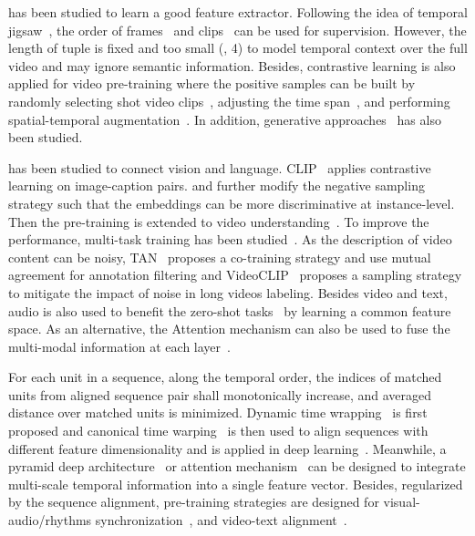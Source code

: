  has been studied to learn a good feature extractor. 
Following the idea of temporal jigsaw~\cite{huo2020self}, the order of frames~\citep{misra2016shuffle,lee2017unsupervised} and clips~\citep{xu2019self} can be used for supervision. However, the length of tuple is fixed and too small (\eg, 4) to model temporal context over the full video and may ignore semantic information.
Besides, contrastive learning is also applied for video pre-training where the positive samples can be built by randomly selecting shot video clips~\citep{feichtenhofer2021large}, adjusting the time span~\citep{recasens2021broaden}, and performing spatial-temporal augmentation~\citep{jenni2020video}. In addition, generative approaches~\cite{han2020memory,vondrick2016generating} has also been studied.

 has been studied to connect vision and language. CLIP~\citep{radford2021learning} applies contrastive learning on image-caption pairs.
\citet{yang2022unified} and \citet{li2022grounded} further modify the negative sampling strategy such that the embeddings can be more discriminative at instance-level. 
Then the pre-training is extended to video understanding~\citet{miech2020end,ging2020coot,gabeur2020multi,alayrac2020self,wang2022object}. To improve the performance,  multi-task training has been studied~\citep{li2020hero,luo2020univl}. 
As the description of video content can be noisy, TAN~\citep{han2022temporal} proposes a co-training strategy and use mutual agreement for annotation filtering and VideoCLIP~\citep{xu2021videoclip} proposes a sampling strategy to mitigate the impact of noise in long videos labeling.
Besides video and text, audio is also used to benefit the zero-shot tasks~\citep{chen2021multimodal,shvetsova2022everything} by learning a common feature space.
As an alternative, the Attention mechanism can also be used to fuse the multi-modal information at each layer~\citep{sun2019videobert,su2019vl,chen2020uniter}.

 For each unit in a sequence, along the temporal order, the indices of matched units from aligned sequence pair shall monotonically increase, and averaged distance over matched units is minimized.
Dynamic time wrapping~\citep{muller2007dynamic} is first proposed and canonical time warping~\citep{zhou2009canonical} is then used to align sequences with different feature dimensionality and is applied in deep learning~\citep{sargin2007audiovisual}.
Meanwhile, a pyramid deep architecture~\citep{wang2020alignnet} or attention mechanism~\citep{bishay2019tarn,zhang2020few,ma2019cdsa} can be designed to integrate multi-scale temporal information into a single feature vector.
Besides, regularized by the sequence alignment, pre-training strategies are designed for visual-audio/rhythms synchronization~\citep{cheng2020look,yu2022self}, and video-text alignment~\citep{xu2021videoclip}. 

